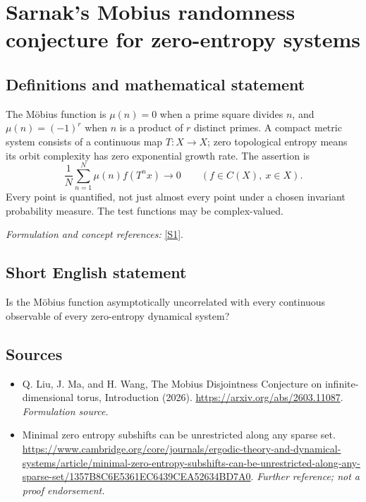 \documentclass[11pt]{article}
\begin{document}
\section*{\texorpdfstring{Sarnak's Mobius randomness conjecture for zero-entropy systems}{Sarnak's Mobius randomness conjecture for zero-entropy systems}}\label{84}
\subsection{Definitions and mathematical statement}
The Möbius function is $\mu(n)=0$ when a prime square divides $n$, and $\mu(n)=(-1)^r$ when $n$ is a product of $r$ distinct primes. A compact metric system consists of a continuous map $T:X\to X$; zero topological entropy means its orbit complexity has zero exponential growth rate. The assertion is
\[
 \frac1N\sum_{n=1}^{N}\mu(n)f(T^nx)\longrightarrow0
 \qquad(f\in C(X),\ x\in X).
\]
Every point is quantified, not just almost every point under a chosen invariant probability measure. The test functions may be complex-valued.
\par\smallskip\textit{Formulation and concept references:} \href{https://arxiv.org/abs/2603.11087}{[S1]}.

\subsection{Short English statement}
Is the Möbius function asymptotically uncorrelated with every continuous observable of every zero-entropy dynamical system?
\subsection{Sources}
\begin{itemize}
\item[S1]Q. Liu, J. Ma, and H. Wang, The Mobius Disjointness Conjecture on infinite-dimensional torus, Introduction (2026).
\url{https://arxiv.org/abs/2603.11087}.
\textit{Formulation source.}
\item[S2]Minimal zero entropy subshifts can be unrestricted along any sparse set.
\url{https://www.cambridge.org/core/journals/ergodic-theory-and-dynamical-systems/article/minimal-zero-entropy-subshifts-can-be-unrestricted-along-any-sparse-set/1357B8C6E5361EC6439CEA52634BD7A0}.
\textit{Further reference; not a proof endorsement.}
\end{itemize}
\end{document}
